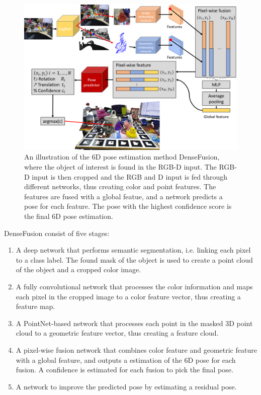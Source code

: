 \documentclass[../main.tex]{subfiles}
\begin{document}
\begin{figure}[H]
    \centering
    \includegraphics[width=\textwidth]{figures/dense_fusion/dense_fusion_overview.png}
    \caption{An illustration of the 6D pose estimation method DenseFusion, where the object of interest is found in the RGB-D input. The RGB-D input is then cropped and the RGB and D input is fed through different networks, thus creating color and point features. The features are fused with a global featue, and a network predicts a pose for each feature. The pose with the highest confidence score is the final 6D pose estimation.}
    \label{fig:dense_fusion_overview}
\end{figure}

DenseFusion consist of five stages:
\begin{enumerate}
    \item A deep network that performs semantic segmentation, i.e. linking each pixel to a class label. The found mask of the object is used to create a point cloud of the object and a cropped color image.
    \item A fully convolutional network that processes the color information and maps each pixel in the cropped image to a color feature vector, thus creating a feature map.
    \item A PointNet-based \cite{pointnet} network that processes each point in the masked 3D point cloud to a geometric feature vector, thus creating a feature cloud.
    \item A pixel-wise fusion network that combines color feature and geometric feature with a global feature, and outputs a estimation of the 6D pose for each fusion. A confidence is estimated for each fusion to pick the final pose.
    \item A network to improve the predicted pose by estimating a residual pose. 
\end{enumerate}
\end{document}
